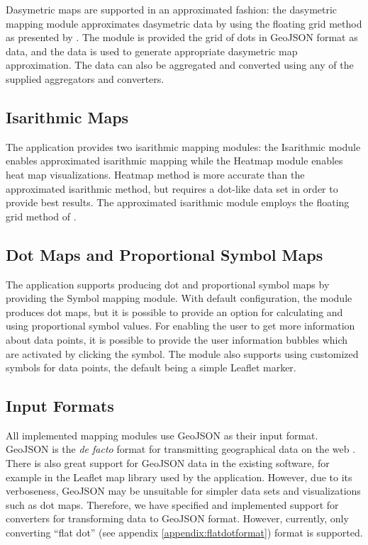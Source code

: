 Dasymetric maps are supported in an approximated fashion: the dasymetric mapping module approximates dasymetric data by using the floating grid method as presented by \citet{langford_generating_1994}. The module is provided the grid of dots in GeoJSON format as data, and the data is used to generate appropriate dasymetric map approximation. The data can also be aggregated and converted using any of the supplied aggregators and converters.


\subsection{Isarithmic Maps}

The application provides two isarithmic mapping modules: the Isarithmic module enables approximated isarithmic mapping while the Heatmap module enables heat map visualizations. Heatmap method is more accurate than the approximated isarithmic method, but requires a dot-like data set in order to provide best results. The approximated isarithmic module employs the floating grid method of \citet{langford_generating_1994}. 


\subsection{Dot Maps and Proportional Symbol Maps}

The application supports producing dot and proportional symbol maps by providing the Symbol mapping module. With default configuration, the module produces dot maps, but it is possible to provide an option for calculating and using proportional symbol values. For enabling the user to get more information about data points, it is possible to provide the user information bubbles which are activated by clicking the symbol. The module also supports using customized symbols for data points, the default being a simple Leaflet marker.


\subsection{Input Formats}

All implemented mapping modules use GeoJSON as their input format. GeoJSON is the \emph{de facto} format for transmitting geographical data on the web \citep{bostock_code_2013}. There is also great support for GeoJSON data in the existing software, for example in the Leaflet map library used by the application. However, due to its verboseness, GeoJSON may be unsuitable for simpler data sets and visualizations such as dot maps. Therefore, we have specified and implemented support for converters for transforming data to GeoJSON format. However, currently, only converting ``flat dot'' (see appendix \ref{appendix:flatdotformat}) format is supported.

